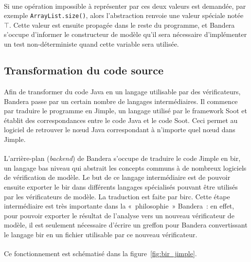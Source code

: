 \paragraph{}
Si une opération impossible à représenter par ces deux valeurs est
demandée, par exemple \verb|ArrayList.size()|, alors l'abstraction
renvoie une valeur spéciale notée $\top$. Cette valeur est ensuite
propagée dans le reste du programme, et Bandera s'occupe d'informer le
constructeur de modèle qu'il sera nécessaire d'implémenter un test
non-déterministe quand cette variable sera utilisée.

\subsection{Transformation du code source}
\label{sec:bandera_source}

\paragraph{}
Afin de transformer du code Java en un langage utilisable par des
vérificateurs, Bandera passe par un certain nombre de langages
intermédiaires. Il commence par traduire le programme en Jimple, un
langage utilisé par le framework Soot et établit des correspondances
entre le code Java et le code Soot. Ceci permet au logiciel de
retrouver le n\oe{}ud Java correspondant à n'importe quel n\oe{}ud
dans Jimple.

\paragraph{}
L'arrière-plan (\textit{backend}) de Bandera s'occupe de traduire le
code Jimple en \gls{bir}, un langage bas niveau qui abstrait les
concepts communs à de nombreux logiciels de vérification de modèle. Le
but de ce langage intermédiaire est de pouvoir ensuite exporter le
\gls{bir} dans différents langages spécialisés pouvant être utilisés
par les vérificateurs de modèle. La traduction est faite par
\gls{birc}. Cette étape intermédiaire est très importante dans la
«~philosophie~» Bandera~: en effet, pour pouvoir exporter le résultat
de l'analyse vers un nouveau vérificateur de modèle, il est seulement
nécessaire d'écrire un greffon pour Bandera convertissant le langage
\gls{bir} en un fichier utilisable par ce nouveau vérificateur.

\paragraph{}
Ce fonctionnement est schématisé dans la figure~\ref{fig:bir_jimple}.

